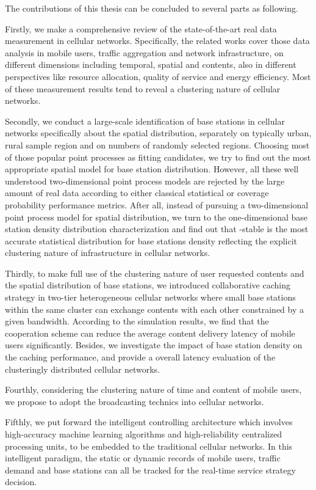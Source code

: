 The contributions of this thesis can be concluded to several parts as following.

Firstly, we make a comprehensive review of the state-of-the-art real data measurement in cellular networks. Specifically,  the related works cover those data analysis in mobile users, traffic aggregation and network infrastructure, on different dimensions including temporal, spatial and contents, also in different perspectives like resource allocation, quality of service and energy efficiency. Most of these measurement results tend to reveal a clustering nature of cellular networks.

Secondly, we conduct a large-scale identification of base stations in cellular networks specifically about the spatial distribution, separately on typically urban, rural sample region and on numbers of randomly selected regions. Choosing most of those popular point processes as fitting candidates, we try to find out the most appropriate spatial model for base station distribution. However, all these well understood two-dimensional point process models are rejected by the large amount of real data according to either classical statistical or coverage probability performance metrics. After all, instead of pursuing a two-dimensional point process model for spatial distribution, we turn to the one-dimensional base station density distribution characterization and find out that \alpha-stable is the most accurate statistical distribution for base stations density reflecting the explicit clustering nature of infrastructure in cellular networks.

Thirdly, to make full use of the clustering nature of user requested contents and the spatial distribution of base stations, we introduced collaborative caching strategy in two-tier heterogeneous cellular networks where small base stations within the same cluster can exchange contents with each other constrained by a given bandwidth. According to the simulation results, we find that the cooperation scheme can reduce the average content delivery latency of mobile users significantly. Besides, we investigate the impact of base station density on the caching performance, and provide a overall latency evaluation of the clusteringly distributed cellular networks.

Fourthly, considering the clustering nature of time and content of mobile users, we propose to adopt the broadcasting technics into cellular networks.

Fifthly, we put forward the intelligent controlling architecture which involves high-accuracy machine learning algorithms and high-reliability centralized processing units, to be embedded to the traditional cellular networks. In this intelligent paradigm, the static or dynamic records of mobile users, traffic demand and base stations can all be tracked for the real-time service strategy decision.

